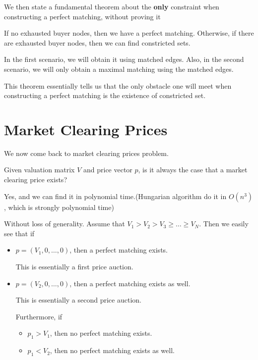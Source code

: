 We then state a fundamental theorem about the \textbf{only} constraint when constructing a perfect matching, without proving it
\begin{theorem}
	If no exhausted buyer nodes, then we have a perfect matching. Otherwise, if there are exhausted buyer nodes, then we
	can find constricted sets.
\end{theorem}
\begin{note}
	In the first scenario, we will obtain it using matched edges. Also, in the second scenario, we will only obtain a maximal matching
	using the matched edges.
\end{note}

\begin{remark}
	This theorem essentially tells us that the only obstacle one will meet when constructing a perfect matching is the existence of
	constricted set.
\end{remark}

\section{Market Clearing Prices}
We now come back to market clearing prices problem.

\begin{problem}
Given valuation matrix \(V\) and price vector \(p\), is it always the case that a market clearing price exists?
\end{problem}

\begin{answer}
	Yes, and we can find it in polynomial time.(Hungarian algorithm do it in \(O(n^{3})\), which is strongly polynomial time)
\end{answer}

Without loss of generality. Assume that \(V_{1}>V_{2}>V_{3}\geq \ldots \geq V_{N}\). Then we easily see that if
\begin{itemize}
	\item \(p = (V_{1}, 0, \ldots , 0 )\), then a perfect matching exists.
	      \begin{note}
		      This is essentially a first price auction.
	      \end{note}
	\item \(p = (V_{2}, 0, \ldots , 0 )\), then a perfect matching exists as well.
	      \begin{note}
		      This is essentially a second price auction.
	      \end{note}
	      Furthermore, if
	      \begin{itemize}
		      \item \(p_{1}>V_{1}\), then no perfect matching exists.
		      \item \(p_{1}<V_{2}\), then no perfect matching exists as well.
	      \end{itemize}
\end{itemize}

